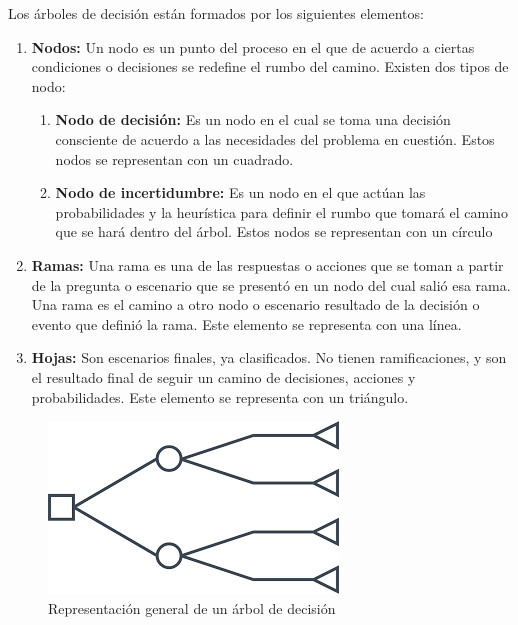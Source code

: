 Los árboles de decisión están formados por los siguientes elementos:\\

\begin{enumerate}
	\item \textbf{Nodos:} Un nodo es un punto del proceso en el que de acuerdo a ciertas condiciones o decisiones se redefine el rumbo del camino. Existen dos tipos de nodo\cite{arbolPartes}:
	\begin{enumerate}
		\item \textbf{Nodo de decisión:} Es un nodo en el cual se toma una decisión consciente de acuerdo a las necesidades del problema en cuestión. Estos nodos se representan con un cuadrado.
		\item \textbf{Nodo de incertidumbre: } Es un nodo en el que actúan las probabilidades y la heurística para definir el rumbo que tomará el camino que se hará dentro del árbol. Estos nodos se representan con un círculo
	\end{enumerate}
	\item \textbf{Ramas:} Una rama es una de las respuestas o acciones que se toman a partir de la pregunta o escenario que se presentó en un nodo del cual salió esa rama. Una rama es el camino a otro nodo o escenario resultado de la decisión o evento que definió la rama. Este elemento se representa con una línea\cite{arbolPartes}.
	\item \textbf{Hojas:} Son escenarios finales, ya clasificados. No tienen ramificaciones, y son el resultado final de seguir un camino de decisiones, acciones y probabilidades. Este elemento se representa con un triángulo\cite{arbolPartes}.
\end{enumerate}

\begin{figure}[!htbp]
	\hypertarget{fig:arbol-decision-ejemplo}{\hspace{1pt}}
	\begin{center}
		\includegraphics[height=0.3\textheight]{capitulo2/images/arbol-decision-ejemplo.png}
		\caption{Representación general de un árbol de decisión}
		\label{fig:arbol-decision-ejemplo}
	\end{center}
\end{figure}

